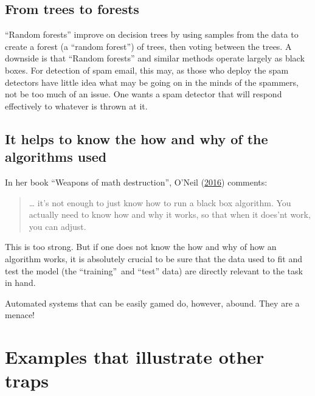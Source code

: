 \documentclass[
  10pt,
  b5paper]{book}
\begin{document}
\hypertarget{from-trees-to-forests}{%
\subsection*{From trees to forests}\label{from-trees-to-forests}}

``Random forests'' improve on decision trees by using samples from
the data to create a forest (a ``random forest'') of trees, then
voting between the trees. A downside is that ``Random forests''
and similar methods operate largely as black boxes. For
detection of spam email, this may, as those who deploy the
spam detectors have little idea what may be going on in the
minds of the spammers, not be too much of an issue. One
wants a spam detector that will respond effectively to
whatever is thrown at it.

\hypertarget{it-helps-to-know-the-how-and-why-of-the-algorithms-used}{%
\subsection*{It helps to know the how and why of the algorithms used}\label{it-helps-to-know-the-how-and-why-of-the-algorithms-used}}

In her book ``Weapons of math destruction'', O'Neil (\protect\hyperlink{ref-oneil_2016}{2016})
comments:

\begin{quote}
\ldots{} it's not enough to just know how to run a black box
algorithm. You actually need to know how and why it works,
so that when it does'nt work, you can adjust.
\end{quote}

This is too strong. But if one does not know the how and
why of how an algorithm works, it is absolutely crucial to
be sure that the data used to fit and test the model
(the ``training''~and ``test'' data) are directly relevant to
the task in hand.

Automated systems that can be easily gamed do, however,
abound. They are a menace!

\hypertarget{examples-that-illustrate-other-traps}{%
\section{Examples that illustrate other traps}\label{examples-that-illustrate-other-traps}}
\end{document}
